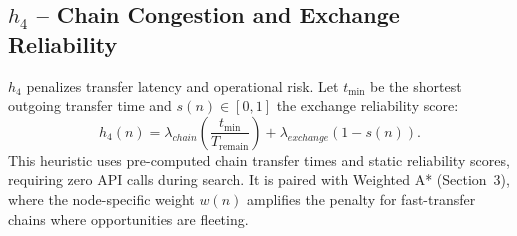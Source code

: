\subsection{$h_4$ -- Chain Congestion and Exchange Reliability}

$h_4$ penalizes transfer latency and operational risk. Let $t_{\min}$ be the shortest outgoing transfer time and $s(n) \in [0,1]$ the exchange reliability score:
\[
h_4(n) = \lambda_{chain}\!\left(\frac{t_{\min}}{T_{\text{remain}}}\right) + \lambda_{exchange}\!\left(1 - s(n)\right).
\]
This heuristic uses pre-computed chain transfer times and static reliability scores, requiring zero API calls during search. It is paired with Weighted A* (Section~3), where the node-specific weight $w(n)$ amplifies the penalty for fast-transfer chains where opportunities are fleeting.
